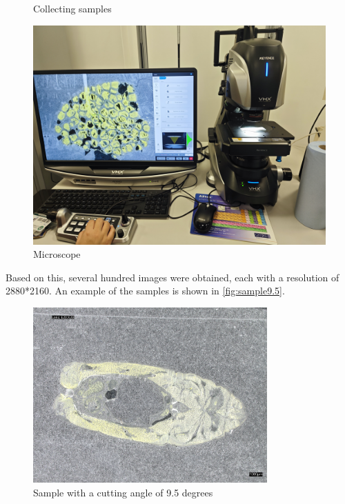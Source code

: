 \begin{figure}[htbp]
\begin{minipage}{0.3\textwidth}
        \caption{Collecting samples}
        \label{fig:采集样本}
    \end{minipage}
    \begin{minipage}{0.35\textwidth}
        \centering
        \includegraphics[width=\textwidth]{./fig/显微镜.jpg}
        \caption{Microscope}
        \label{fig:显微镜}
    \end{minipage}
\end{figure}


Based on this, several hundred images were obtained, each with a resolution of 2880*2160. An example of the samples is shown in \autoref{fig:sample9.5}.


\begin{figure}
    \centering
    \includegraphics[width=0.8\textwidth]{./fig/sample9.5.jpg}
    \caption{Sample with a cutting angle of 9.5 degrees}
    \label{fig:sample9.5}
\end{figure}


